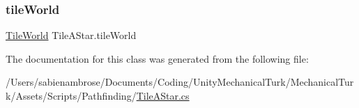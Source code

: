 \subsubsection{\texorpdfstring{tile\+World}{tileWorld}}
{\footnotesize\ttfamily \mbox{\hyperlink{class_tile_world}{Tile\+World}} Tile\+A\+Star.\+tile\+World}



The documentation for this class was generated from the following file\+:\begin{DoxyCompactItemize}
\item 
/\+Users/sabienambrose/\+Documents/\+Coding/\+Unity\+Mechanical\+Turk/\+Mechanical\+Turk/\+Assets/\+Scripts/\+Pathfinding/\mbox{\hyperlink{_tile_a_star_8cs}{Tile\+A\+Star.\+cs}}\end{DoxyCompactItemize}
